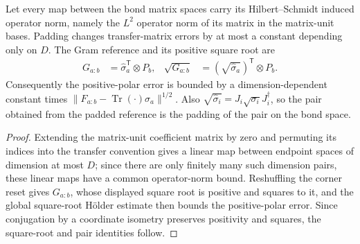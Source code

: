 \begin{lemma}
    \label{thm:ldp_rectangular_gram_pairs}
    \leanok
    Let every map between the bond matrix spaces carry its Hilbert--Schmidt
    induced operator norm, namely the $L^2$ operator norm of its
    matrix in the matrix-unit bases. Padding changes transfer-matrix
    errors by at most a constant depending only on $D$.
    The Gram reference and its positive square root are
    \begin{align}
        G_{a:b} & =\widehat\sigma_a^{\mathsf T}\otimes P_b,
                & \sqrt{G_{a:b}}                            & =(\sqrt{\widehat\sigma_a})^{\mathsf T}\otimes P_b.
    \end{align}
    Consequently the positive-polar error is bounded by a
    dimension-dependent constant times
    $\|F_{a:b}-\operatorname{Tr}(\cdot)\sigma_a\|^{1/2}$.
    Also $\sqrt{\widehat\sigma_i}=J_i\sqrt{\sigma_i}J_i^\dagger$,
    so the pair obtained from the padded reference is the
    padding of the pair on the bond space.
\end{lemma}
\begin{proof}\leanok
    Extending the matrix-unit coefficient matrix by zero and permuting its
    indices into the transfer convention gives a linear map between
    endpoint spaces of dimension at most $D$; since there are only finitely
    many such dimension pairs, these linear maps have a common
    operator-norm bound. Reshuffling the corner reset gives $G_{a:b}$,
    whose displayed square root is positive and squares to it, and the
    global square-root H\"older estimate then bounds the positive-polar
    error. Since conjugation by a coordinate isometry preserves positivity
    and squares, the square-root and pair identities follow.
\end{proof}

